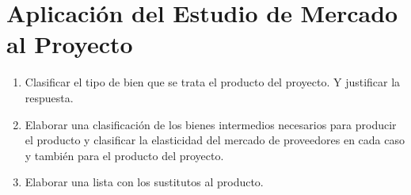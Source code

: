 \documentclass[../main]{subfiles}
\begin{document}
\chapter{Aplicación del Estudio de Mercado al Proyecto}
\begin{enumerate}
  \item Clasificar el tipo de bien que se trata el producto del
    proyecto. Y justificar la respuesta.
  \item Elaborar una clasificación de los bienes intermedios
    necesarios para producir el producto y clasificar la elasticidad
    del mercado de proveedores en cada caso y también para el
    producto del proyecto.
  \item Elaborar una lista con los sustitutos al producto.
\end{enumerate}
\end{document}
